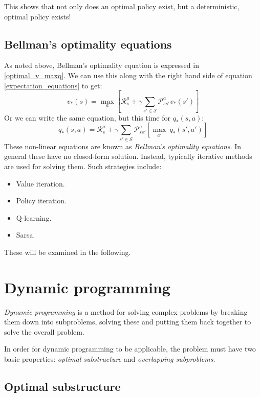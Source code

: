 \documentclass[12pt, a4paper]{article}
\numberwithin{equation}{section}
\begin{document}
This shows that not only does an optimal policy exist, but a deterministic, optimal policy exists!

\subsection{Bellman's optimality equations}
As noted above, Bellman's optimality equation is expressed in \ref{optimal_v_maxq}. We can use this along with the right hand side of equation \ref{expectation_equations} to get:
\begin{equation}
v_*(s)=\underset{a}{\max}\left[\mathcal{R}^a_s+\gamma\sum_{s'\in\mathcal{S}}\mathcal{P}^a_{ss'}v_*(s')\right]
\label{optimal_v}
\end{equation}
Or we can write the same equation, but this time for $q_*(s,a)$:
\begin{equation}
q_*(s,a)=\mathcal{R}^a_s+\gamma\sum_{s'\in\mathcal{S}}\mathcal{P}^a_{ss'}\left[\underset{a'}{\max}\ q_*(s',a')\right]
\label{optimal_q}
\end{equation}
These non-linear equations are known as \textit{Bellman's optimality equations}. In general these have no closed-form solution. Instead, typically iterative methods are used for solving them. Such strategies include:
\begin{itemize}
\item Value iteration.
\item Policy iteration.
\item Q-learning.
\item Sarsa.
\end{itemize}
These will be examined in the following.

\section{Dynamic programming}
\textit{Dynamic programming} is a method for solving complex problems by breaking them down into subproblems, solving these and putting them back together to solve the overall problem.

In order for dynamic programming to be applicable, the problem must have two basic properties: \textit{optimal substructure} and \textit{overlapping subproblems}.

\subsection{Optimal substructure}
\end{document}
